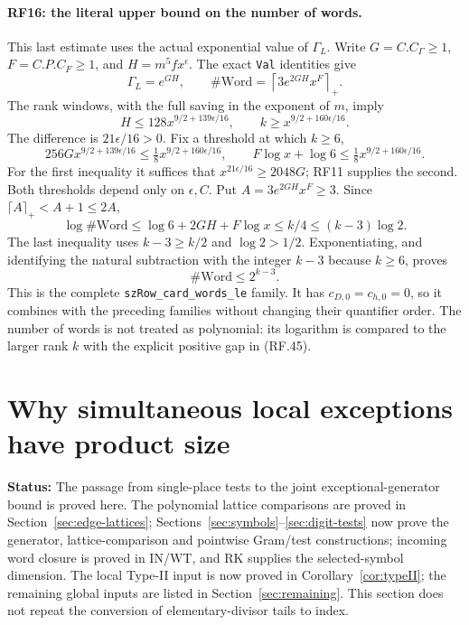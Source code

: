 \documentclass[11pt,a4paper]{article}
\numberwithin{equation}{section}
\theoremstyle{remark}\newtheorem{remark}[theorem]{Remark}
\newcommand{\status}[1]{\textbf{Status:} #1}
\begin{document}
\paragraph{RF16: the literal upper bound on the number of words.}
This last estimate uses the actual exponential value of $\Gamma_L$.
Write $G=C.C_\Gamma\geq1$, $F=C.P.C_F\geq1$, and
$H=m^5f x^\epsilon$. The exact \texttt{Val} identities give
\[
 \Gamma_L=e^{GH},\qquad
 \#\mathrm{Word}=\left\lceil3e^{2GH}x^F\right\rceil_+.
                                                               \tag{RF.44}
\]
The rank windows, with the full saving in the exponent of $m$, imply
\[
 H\leq128x^{9/2+139\epsilon/16},\qquad
 k\geq x^{9/2+160\epsilon/16}.                              \tag{RF.45}
\]
The difference is $21\epsilon/16>0$. Fix a threshold at which
$k\geq6$,
\[
 256Gx^{9/2+139\epsilon/16}
                  \leq\tfrac18x^{9/2+160\epsilon/16},
 \qquad F\log x+\log6
                  \leq\tfrac18x^{9/2+160\epsilon/16}.        \tag{RF.46}
\]
For the first inequality it suffices that
$x^{21\epsilon/16}\geq2048G$; RF11 supplies the second.
Both thresholds depend only on $\epsilon,C$.
Put $A=3e^{2GH}x^F\geq3$. Since
$\lceil A\rceil_+<A+1\leq2A$,
\[
 \log\#\mathrm{Word}
       \leq\log6+2GH+F\log x\leq k/4
       \leq(k-3)\log2.                                     \tag{RF.47}
\]
The last inequality uses $k-3\geq k/2$ and $\log2>1/2$.
Exponentiating, and identifying the natural subtraction with the
integer $k-3$ because $k\geq6$, proves
\[
                         \#\mathrm{Word}\leq2^{k-3}.         \tag{RF.48}
\]
This is the complete \texttt{szRow\_\allowbreak card\_\allowbreak words\_\allowbreak le} family.
It has $c_{D,0}=c_{h,0}=0$, so it combines with the preceding
families without changing their quantifier order. The number of words
is not treated as polynomial: its logarithm is compared to the
larger rank $k$ with the explicit positive gap in (RF.45).


\section{Why simultaneous local exceptions have product size}\label{sec:joint-rank}

\status{The passage from single-place tests to the joint exceptional-generator bound is proved here. The polynomial lattice comparisons are proved in Section~\ref{sec:edge-lattices}; Sections~\ref{sec:symbols}--\ref{sec:digit-tests} now prove the generator, lattice-comparison and pointwise Gram/test constructions; incoming word closure is proved in IN/WT, and RK supplies the selected-symbol dimension. The local Type-II input is now proved in Corollary~\ref{cor:typeII}; the remaining global inputs are listed in Section~\ref{sec:remaining}. This section does not repeat the conversion of elementary-divisor tails to index.}
\end{document}
